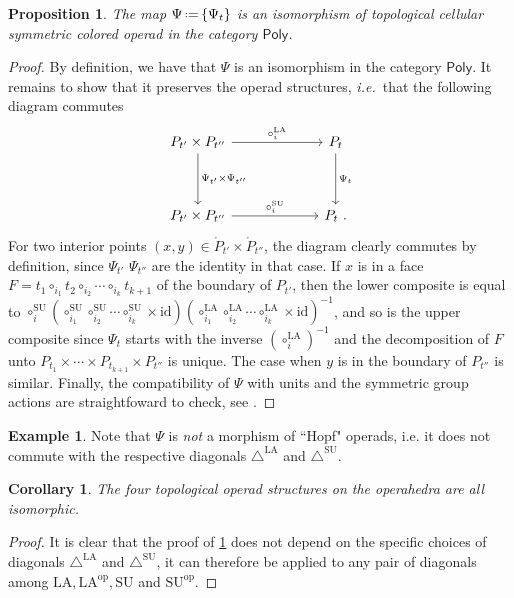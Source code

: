 \documentclass{amsart}
\newtheorem{corollary}[theorem]{Corollary}
\newtheorem{proposition}[theorem]{Proposition}
\theoremstyle{definition}
\newtheorem{example}[theorem]{Example}
\newcommand{\eqdef}{\mbox{\,\raisebox{0.2ex}{\scriptsize\ensuremath{\mathrm:}}\ensuremath{=}\,}} %
\newcommand{\ie}{\textit{i.e.}~} %
\newcommand{\SU}{\mathrm{SU}}
\newcommand{\LA}{\mathrm{LA}}
\newcommand{\SUD}{\triangle^{\mathrm{SU}}}
\newcommand{\LAD}{\triangle^{\mathrm{LA}}}
\newcommand{\PolySub}{\mathsf{Poly}}
\newcommand{\op}{\mathrm{op}}
\newcommand{\id}{\mathrm{id}}
\begin{document}
\begin{proposition}
    \label{thm:top-iso}
    The map $\Psi \eqdef \{\Psi_t\}$ is an isomorphism of topological cellular symmetric colored operad in the category $\PolySub$.
\end{proposition}

\begin{proof}
    By definition, we have that $\Psi$ is an isomorphism in the category $\PolySub$. 
    It remains to show that it preserves the operad structures, \ie that the following diagram commutes
    \[
    \vcenter{\hbox{
    \begin{tikzcd}[column sep=2.2cm, row sep=1.3cm]
    P_{t'}\times P_{t''}
    \arrow[r,  "\circ_i^\LA"] 
    \arrow[d,  "\Psi_{t'}\times\Psi_{t''}"]
    & P_{t} \arrow[d,  "\Psi_t"] \\
    P_{t'}\times P_{t''}  
    \arrow[r,  "\circ_i^\SU"]
    & P_{t}\ .
    \end{tikzcd}
    }}\]
    For two interior points $(x,y) \in \mathring P_{t'}\times \mathring P_{t''}$, the diagram clearly commutes by definition, since $\Psi_{t'}$ $\Psi_{t''}$ are the identity in that case. 
    If $x$ is in a face $F=t_1 \circ_{i_1} t_2 \circ_{i_2} \cdots \circ_{i_k} t_{k+1}$ of the boundary of $P_{t'}$, then the lower composite is equal to $\circ_i^\SU (\circ_{i_1}^\SU \circ_{i_2}^\SU \cdots \circ_{i_k}^\SU \times \id)(\circ_{i_1}^\LA \circ_{i_2}^\LA \cdots \circ_{i_k}^\LA \times \id)^{-1}$, and so is the upper composite since $\Psi_t$ starts with the inverse $(\circ_i^\LA)^{-1}$ and the decomposition of $F$ unto $P_{t_1} \times \cdots \times P_{t_{k+1}} \times P_{t''}$ is unique.
    The case when $y$ is in the boundary of $P_{t''}$ is similar.  
    Finally, the compatibility of $\Psi$ with units and the symmetric group actions are straightfoward to check, see \cite[Def.~4.17 \& Thm.~4.18]{LA21}.
\end{proof}

\begin{example}
Note that $\Psi$ is \emph{not} a morphism of ``Hopf" operads, i.e. it does not commute with the respective diagonals $\LAD$ and $\SUD$. 
\end{example}

\begin{corollary}
    The four topological operad structures on the operahedra are all isomorphic. 
\end{corollary}

\begin{proof}
    It is clear that the proof of \cref{thm:top-iso} does not depend on the specific choices of diagonals $\LAD$ and $\SUD$, it can therefore be applied to any pair of diagonals among $\LA, \LA^\op, \SU$ and $\SU^\op$. 
\end{proof}
\end{document}
